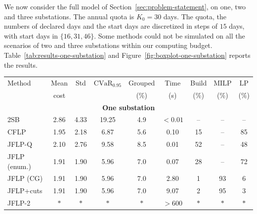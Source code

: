 \documentclass{article}
\begin{document}
We now consider the full model of Section~\ref{sec:problem-statement}, on one, two and three substations. The annual
quota is $K_0 = 30$ days. The quota, the numbers of declared days and the start days are discretized in
steps of $15$ days, with start days in $\{16, 31, 46\}$. Some methods could not be simulated on all the scenarios of
two and three substations within our computing budget. Table~\ref{tab:results-one-substation} and Figure~\ref{fig:boxplot-one-substation} reports the results.

\begin{table}[H]
\centering
\small
\setlength{\tabcolsep}{4pt}
\begin{tabular}{lcccccccc}
\toprule
Method & Mean & Std & $\mathrm{CVaR}_{0.95}$ & Grouped & Time & Build & MILP & LP \\
 & cost & & & (\%) & (s) & (\%) & (\%) & (\%) \\
\midrule
\multicolumn{9}{c}{\textbf{One substation}} \\
\midrule
2SB & 2.86 & 4.33 & 19.25 & 4.9 & $< 0.01$ & -- & -- & -- \\
CFLP & 1.95 & 2.18 & 6.87 & 5.6 & 0.10 & 15 & -- & 85 \\
JFLP-Q & 2.10 & 2.76 & 9.58 & 8.5 & 0.01 & 52 & -- & 48 \\
JFLP (enum.) & 1.91 & 1.90 & 5.96 & 7.0 & 0.07 & 28 & -- & 72 \\
JFLP (CG) & 1.91 & 1.90 & 5.96 & 7.0 & 2.80 & 1 & 93 & 6 \\
JFLP+cuts & 1.91 & 1.90 & 5.96 & 7.0 & 9.07 & 2 & 95 & 3 \\
JFLP-2 & $\ast$ & $\ast$ & $\ast$ & $\ast$ & $> 600$ & $\ast$ & $\ast$ & $\ast$ \\
\midrule

\end{tabular}
\end{table}
\end{document}
